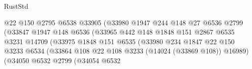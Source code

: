 \begin{lexlean}{RustStd}
\begin{coremodule}
                                          @22
                                          @150
                                          @2795
                                          @6538
                                          @33905
                                          (@33980
                                            @1947
                                            @244
                                            @148
                                            @27
                                            @6536
                                            @2799
                                            (@33847
                                              @1947
                                              @148
                                              @6536
                                              (@33965
                                                @442
                                                @148
                                                @1848
                                                @151
                                                @2867
                                                @6535
                                                @3231
                                                @14709
                                                (@33975
                                                  @1848
                                                  @151
                                                  @6535
                                                  (@33980
                                                    @234
                                                    @1847
                                                    @22
                                                    @150
                                                    @3233
                                                    @6534
                                                    (@33864
                                                      @108
                                                      @22
                                                      @108
                                                      @3233
                                                      (@14024 (@33869 @108))
                                                      @16989)
                                                    (@34050
                                                      @6532
                                                      @2799
                                                      (@34054
                                                        @6532

\end{coremodule}
\end{lexlean}

